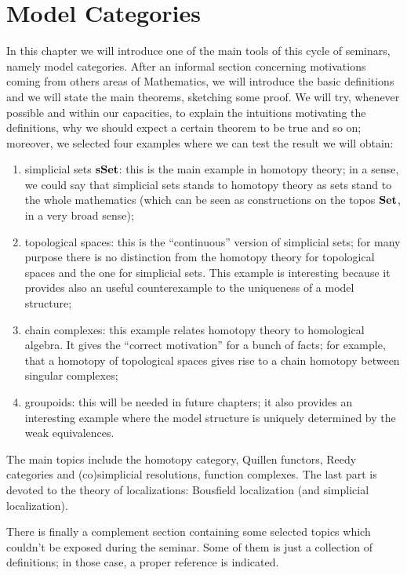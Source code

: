\chapter{Model Categories}

In this chapter we will introduce one of the main tools of this cycle of seminars, namely model categories. After an informal section concerning motivations coming from others areas of Mathematics, we will introduce the basic definitions and we will state the main theorems, sketching some proof. We will try, whenever possible and within our capacities, to explain the intuitions motivating the definitions, why we should expect a certain theorem to be true and so on; moreover, we selected four examples where we can test the result we will obtain:
\begin{enumerate}
\item simplicial sets $\mathbf{sSet}$: this is the main example in homotopy theory; in a sense, we could say that simplicial sets stands to homotopy theory as sets stand to the whole mathematics (which can be seen as constructions on the topos $\mathbf{Set}$, in a very broad sense);
\item topological spaces: this is the ``continuous'' version of simplicial sets; for many purpose there is no distinction from the homotopy theory for topological spaces and the one for simplicial sets. This example is interesting because it provides also an useful counterexample to the uniqueness of a model structure;
\item chain complexes: this example relates homotopy theory to homological algebra. It gives the ``correct motivation'' for a bunch of facts; for example, that a homotopy of topological spaces gives rise to a chain homotopy between singular complexes;
\item groupoids: this will be needed in future chapters; it also provides an interesting example where the model structure is uniquely determined by the weak equivalences.
\end{enumerate}
The main topics include the homotopy category, Quillen functors, Reedy categories and (co)simplicial resolutions, function complexes. The last part is devoted to the theory of localizations: Bousfield localization (and simplicial localization).

There is finally a complement section containing some selected topics which couldn't be exposed during the seminar. Some of them is just a collection of definitions; in those case, a proper reference is indicated.

